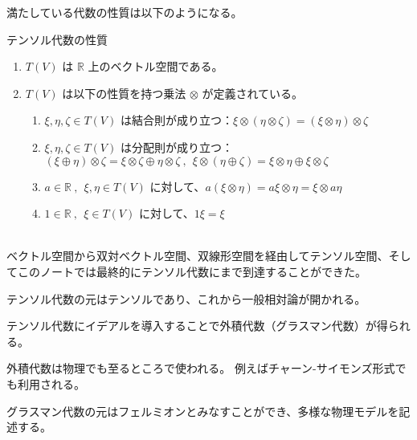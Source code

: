 \documentclass[uplatex,a4j,12pt,dvipdfmx]{jsarticle}
\begin{document}
満たしている代数の性質は以下のようになる。

\begin{itembox}[l]{テンソル代数の性質}
	\begin{enumerate}
		\item $T(V)$ は $\mathbb{R}$ 上のベクトル空間である。
		\item $T(V)$ は以下の性質を持つ乗法 $\otimes$ が定義されている。
		      \begin{enumerate}
			      \item $\xi,\eta,\zeta \in T(V)$ は結合則が成り立つ：$\xi \otimes (\eta \otimes \zeta) = (\xi \otimes \eta) \otimes \zeta$
			      \item $\xi,\eta,\zeta \in T(V)$ は分配則が成り立つ：$(\xi \oplus \eta) \otimes \zeta = \xi \otimes \zeta \oplus \eta \otimes \zeta \ , \ \ \xi \otimes (\eta \oplus \zeta) = \xi \otimes \eta \oplus \xi \otimes \zeta$
			      \item $a \in \mathbb{R} \ , \ \ \xi,\eta \in T(V)$ に対して、$a (\xi \otimes \eta) = a \xi \otimes \eta = \xi \otimes a \eta$
			      \item $1 \in \mathbb{R} \ , \ \ \xi \in T(V)$ に対して、$1\xi=\xi$
		      \end{enumerate}
	\end{enumerate}
\end{itembox}

\ \\

ベクトル空間から双対ベクトル空間、双線形空間を経由してテンソル空間、そしてこのノートでは最終的にテンソル代数にまで到達することができた。

テンソル代数の元はテンソルであり、これから一般相対論が開かれる。

テンソル代数にイデアルを導入することで外積代数（グラスマン代数）が得られる。

外積代数は物理でも至るところで使われる。
例えばチャーン-サイモンズ形式でも利用される。

グラスマン代数の元はフェルミオンとみなすことができ、多様な物理モデルを記述する。
\end{document}
